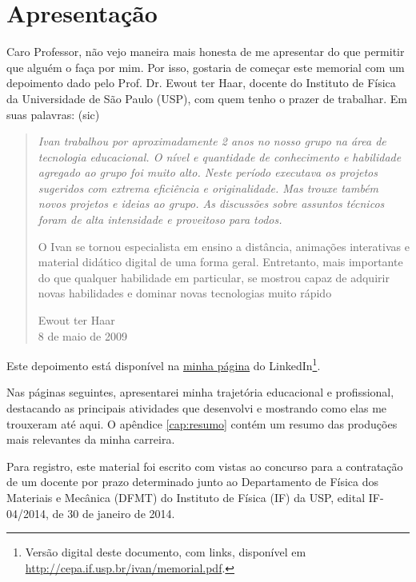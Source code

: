 \chapter{Apresentação}

Caro Professor, não vejo maneira mais honesta de me apresentar do que permitir que alguém o faça por mim. Por isso, gostaria de começar este memorial com um depoimento dado pelo Prof. Dr. Ewout ter Haar, docente do Instituto de Física da Universidade de São Paulo (USP), com quem tenho o prazer de trabalhar. Em suas palavras: (sic)

\begin{quotation}

{\itshape\small Ivan trabalhou por aproximadamente 2 anos no nosso grupo na área de tecnologia educacional. O nível e quantidade de conhecimento e habilidade agregado ao grupo foi muito alto. Neste período executava os projetos sugeridos com extrema eficiência e originalidade. Mas trouxe também novos projetos e ideias ao grupo. As discussões sobre assuntos técnicos foram de alta intensidade e proveitoso para todos. 

O Ivan se tornou especialista em ensino a distância, animações interativas e material didático digital de uma forma geral. Entretanto, mais importante do que qualquer habilidade em particular, se mostrou capaz de adquirir novas habilidades e dominar novas tecnologias muito rápido}

\begin{flushright}
Ewout ter Haar\\8 de maio de 2009
\end{flushright}

\end{quotation}

Este depoimento está disponível na \href{http://br.linkedin.com/in/irpagnossin}{minha página} do LinkedIn\footnote{Versão digital deste documento, com links, disponível em \url{http://cepa.if.usp.br/ivan/memorial.pdf}.}.

Nas páginas seguintes, apresentarei minha trajetória educacional e profissional, destacando as principais atividades que desenvolvi e mostrando como elas me trouxeram até aqui. O apêndice \ref{cap:resumo} contém um resumo das produções mais relevantes da minha carreira.

Para registro, este material foi escrito com vistas ao concurso para a contratação de um docente por prazo determinado junto ao Departamento de Física dos Materiais e Mecânica (DFMT) do Instituto de Física (IF) da USP, edital IF-04/2014, de 30 de janeiro de 2014.

